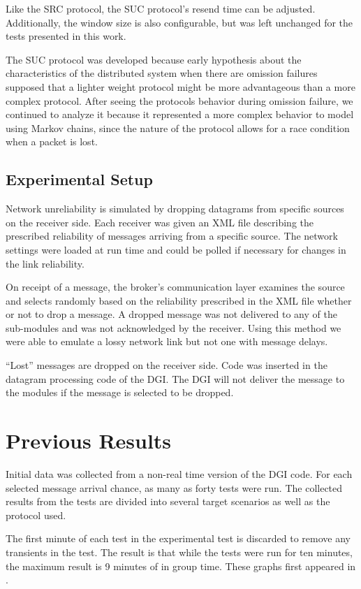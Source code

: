 Like the SRC protocol, the SUC protocol's resend time can be adjusted. 
Additionally, the window size is also configurable, but was left unchanged for 
the tests presented in this work.

The SUC protocol was developed because early hypothesis about the
characteristics of the distributed system when there are omission failures
supposed that a lighter weight protocol might be more advantageous than a more
complex protocol. After seeing the protocols behavior during omission failure,
we continued to analyze it because it represented a more complex behavior to
model using Markov chains, since the nature of the protocol allows for a race
condition when a packet is lost.

\subsection{Experimental Setup}
Network unreliability is simulated by dropping datagrams from specific sources
on the receiver side. Each receiver was given an XML file describing the
prescribed reliability of messages arriving from a specific source. The
network settings were loaded at run time and could be polled if necessary for
changes in the link reliability.

On receipt of a message, the broker's communication layer examines the source
and selects randomly based on the reliability prescribed in the XML file whether
or not to drop a message. A dropped message was not delivered to any of the
sub-modules and was not acknowledged by the receiver. Using this method we were 
able to emulate a lossy network link but not one with message delays.

``Lost'' messages are dropped on the receiver side. Code was inserted in the
datagram processing code of the DGI. The DGI will not deliver the message to
the modules if the message is selected to be dropped.

\section{Previous Results}
Initial data was collected from a non-real time version of the DGI code.
For each selected message arrival chance, as many as forty tests were run.
The collected results from the tests are divided into several target scenarios
as well as the protocol used.

The first minute of each test in the experimental test is discarded to remove
any transients in the test. The result is that while the tests were run for
ten minutes, the maximum result is 9 minutes of in group time. These graphs
first appeared in \cite{CRITIS2012}.

